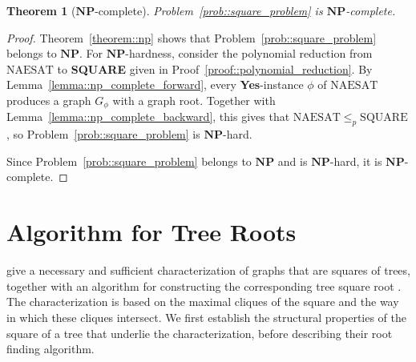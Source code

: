 \documentclass[11pt]{report}
\newtheorem{theorem}{Theorem}
\begin{document}
\begin{theorem}[$\mathbf{NP}$-complete] \label{theorem::np_complete}
  Problem~\eqref{prob::square_problem} is $\mathbf{NP}$-complete.
\end{theorem}
\begin{proof}
  Theorem~\eqref{theorem::np} shows that Problem~\eqref{prob::square_problem} belongs to $\mathbf{NP}$. For $\mathbf{NP}$-hardness, consider the polynomial reduction from $\mathrm{NAESAT}$ to \textbf{SQUARE} given in Proof~\eqref{proof::polynomial_reduction}. By Lemma~\eqref{lemma::np_complete_forward}, every \textbf{Yes}-instance $\phi$ of $\mathrm{NAESAT}$ produces a graph $G_\phi$ with a graph root. Together with Lemma~\eqref{lemma::np_complete_backward}, this gives that $\mathrm{NAESAT} \leq_p \mathrm{SQUARE}$, so Problem~\eqref{prob::square_problem} is $\mathbf{NP}$-hard.

  Since Problem~\eqref{prob::square_problem} belongs to $\mathbf{NP}$ and is $\mathbf{NP}$-hard, it is $\mathbf{NP}$-complete.
\end{proof}

\section{Algorithm for Tree Roots} \label{sec::time_algorithm}

\citeauthor{ross_1960_square} give a necessary and sufficient characterization of graphs that are squares of trees, together with an algorithm for constructing the corresponding tree square root \cite{ross_1960_square}. The characterization is based on the maximal cliques of the square and the way in which these cliques intersect. We first establish the structural properties of the square of a tree that underlie the characterization, before describing their root finding algorithm.
\end{document}
